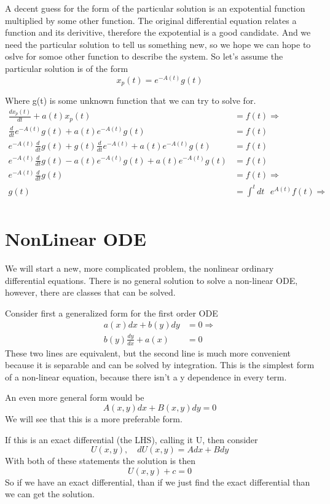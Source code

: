 \documentclass{article}
\newcommand{\be}{\begin{equation}}
\newcommand{\ee}{\end{equation}}
\begin{document}
A decent guess for the form of the particular solution is an expotential function multiplied by some other function.
The original differential equation relates a function and its derivitive, therefore the expotential is a good candidate.
And we need the particular solution to tell us something new, so we hope we can hope to oslve for somoe other function to describe the system. 
So let's assume the particular solution is of the form
\be
x_p(t) = e^{-A(t)}g(t)
\ee

Where g(t) is some unknown function that we can try to solve for. 
\be
\begin{split}
    \frac{dx_p(t)}{dt} + a(t) x_p(t) &= f(t) \Rightarrow \\
    \frac{d}{dt} e^{-A(t)}g(t) + a(t)  e^{-A(t)}g(t) &= f(t)\\
    e^{-A(t)} \frac{d}{dt} g(t) + g(t) \frac{d}{dt} e^{-A(t)} + a(t)  e^{-A(t)}g(t) &= f(t)\\
    e^{-A(t)} \frac{d}{dt} g(t) -a(t) e^{-A(t)} g(t) + a(t)  e^{-A(t)}g(t) &= f(t)\\
    e^{-A(t)} \frac{d}{dt} g(t) &= f(t) \Rightarrow \\
    g(t) &= \int^t dt \text{ }e^{A(t)} f(t) \Rightarrow \\
\end{split}
\ee

\section*{NonLinear ODE}
We will start a new, more complicated problem, the nonlinear ordinary differential equations.
There is no general solution to solve a non-linear ODE, however, there are classes that can be solved.

Consider first a generalized form for the first order ODE
\be
\begin{split}
    a(x) dx + b(y) dy &= 0 \Rightarrow\\
    b(y) \frac{dy}{dx} + a(x) &= 0
\end{split}
\ee
These two lines are equivalent, but the second line is much more convenient because it is separable and can be solved by integration.
This is the simplest form of a non-linear equation, because there isn't a y dependence in every term.

An even more general form would be
\be
A(x,y)dx + B(x,y)dy = 0
\ee
We will see that this is a more preferable form.

If this is an exact differential (the LHS), calling it U, then consider
\be
U(x,y), \quad dU(x,y) = Adx + Bdy
\ee
With both of these statements the solution is then
\be
U(x,y) + c = 0
\ee
So if we have an exact differential, than if we just find the exact differential than we can get the solution.
\end{document}
